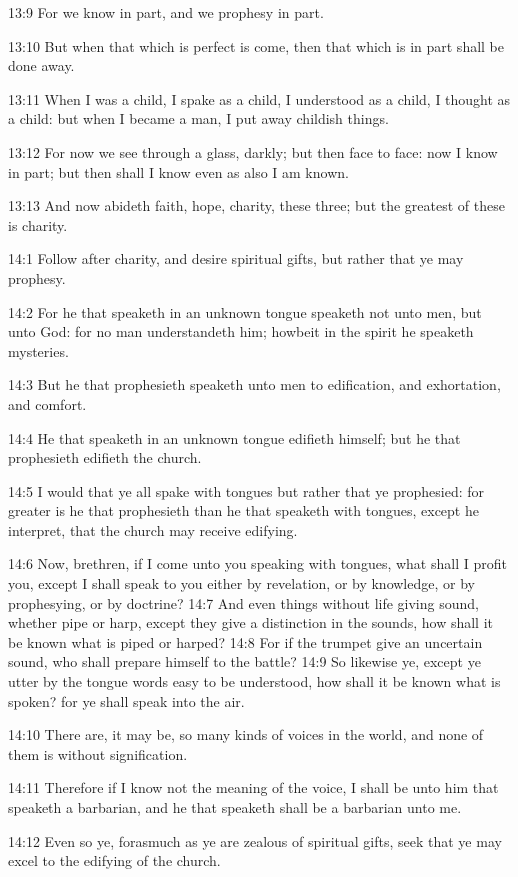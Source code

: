 13:9 For we know in part, and we prophesy in part.

13:10 But when that which is perfect is come, then that which is in
part shall be done away.

13:11 When I was a child, I spake as a child, I understood as a child,
I thought as a child: but when I became a man, I put away childish
things.

13:12 For now we see through a glass, darkly; but then face to face:
now I know in part; but then shall I know even as also I am known.

13:13 And now abideth faith, hope, charity, these three; but the
greatest of these is charity.

14:1 Follow after charity, and desire spiritual gifts, but rather that
ye may prophesy.

14:2 For he that speaketh in an unknown tongue speaketh not unto men,
but unto God: for no man understandeth him; howbeit in the spirit he
speaketh mysteries.

14:3 But he that prophesieth speaketh unto men to edification, and
exhortation, and comfort.

14:4 He that speaketh in an unknown tongue edifieth himself; but he
that prophesieth edifieth the church.

14:5 I would that ye all spake with tongues but rather that ye
prophesied: for greater is he that prophesieth than he that speaketh
with tongues, except he interpret, that the church may receive
edifying.

14:6 Now, brethren, if I come unto you speaking with tongues, what
shall I profit you, except I shall speak to you either by revelation,
or by knowledge, or by prophesying, or by doctrine?  14:7 And even
things without life giving sound, whether pipe or harp, except they
give a distinction in the sounds, how shall it be known what is piped
or harped?  14:8 For if the trumpet give an uncertain sound, who shall
prepare himself to the battle?  14:9 So likewise ye, except ye utter
by the tongue words easy to be understood, how shall it be known what
is spoken? for ye shall speak into the air.

14:10 There are, it may be, so many kinds of voices in the world, and
none of them is without signification.

14:11 Therefore if I know not the meaning of the voice, I shall be
unto him that speaketh a barbarian, and he that speaketh shall be a
barbarian unto me.

14:12 Even so ye, forasmuch as ye are zealous of spiritual gifts, seek
that ye may excel to the edifying of the church.

